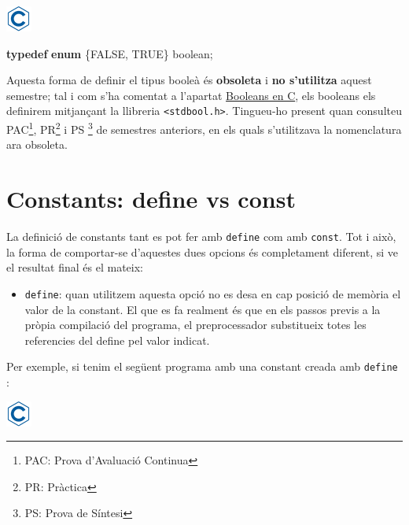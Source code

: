 \documentclass[
]{book}
\newenvironment{Shaded}{\begin{snugshade}}{\end{snugshade}}
\newcommand{\KeywordTok}[1]{\textcolor[rgb]{0.13,0.29,0.53}{\textbf{#1}}}
\newcommand{\NormalTok}[1]{#1}
\providecommand{\tightlist}{%
  \setlength{\itemsep}{0pt}\setlength{\parskip}{0pt}}
\begin{document}
\includegraphics{./img/c.png}

\begin{Shaded}
\begin{Highlighting}[]
\KeywordTok{typedef} \KeywordTok{enum}\NormalTok{ \{FALSE, TRUE\} boolean;}
\end{Highlighting}
\end{Shaded}

Aquesta forma de definir el tipus booleà és \textbf{obsoleta} i \textbf{no s'utilitza} aquest semestre; tal i com s'ha comentat a l'apartat \protect\hyperlink{booleans-en-c}{Booleans en C}, els booleans els definirem mitjançant la llibreria \texttt{\textless{}stdbool.h\textgreater{}}. Tingueu-ho present quan consulteu PAC\footnote{PAC: Prova d'Avaluació Continua}, PR\footnote{PR: Pràctica} i PS \footnote{PS: Prova de Síntesi} de semestres anteriors, en els quals s'utilitzava la nomenclatura ara obsoleta.

\hypertarget{constants-define-vs-const}{%
\section{Constants: define vs const}\label{constants-define-vs-const}}

La definició de constants tant es pot fer amb \texttt{define} com amb \texttt{const}. Tot i això, la forma de comportar-se d'aquestes dues opcions és completament diferent, si ve el resultat final és el mateix:

\begin{itemize}
\tightlist
\item
  \texttt{define}: quan utilitzem aquesta opció no es desa en cap posició de memòria el valor de la constant. El que es fa realment és que en els passos previs a la pròpia compilació del programa, el preprocessador substitueix totes les referencies del define pel valor indicat.
\end{itemize}

Per exemple, si tenim el següent programa amb una constant creada amb \texttt{define} :

\includegraphics{./img/c.png}
\end{document}
